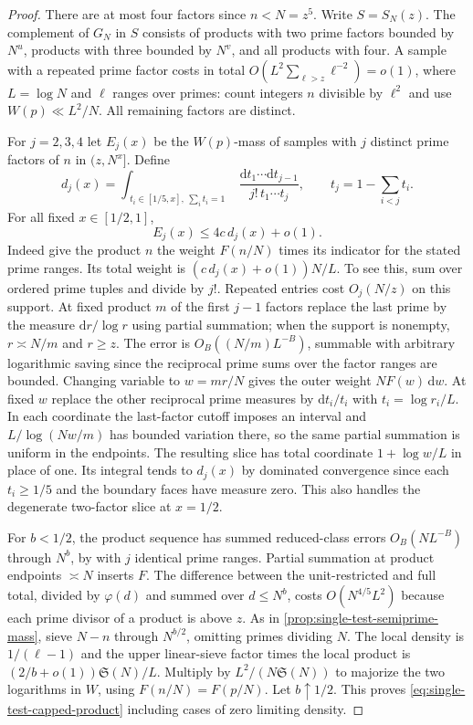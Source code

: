 \documentclass[11pt,a4paper]{article}
\numberwithin{equation}{section}
\newcommand{\SSS}{\mathfrak S}
\newcommand{\ud}{\mathrm d}
\begin{document}
\begin{proof}
There are at most four factors since $n<N=z^5$. Write $S=S_N(z)$.
The complement of $G_N$ in $S$ consists of products with two
prime factors bounded by $N^u$, products with three bounded by
$N^v$, and all products with four. A sample with a repeated
prime factor costs in total $O(L^2\sum_{\ell>z}\ell^{-2})=o(1)$,
where $L=\log N$ and $\ell$ ranges over primes: count integers
$n$ divisible by $\ell^2$ and use $W(p)\ll L^2/N$.
All remaining factors are distinct.

For $j=2,3,4$ let $E_j(x)$ be the $W(p)$-mass of samples with
$j$ distinct prime factors of $n$ in $(z,N^x]$. Define
\[
 d_j(x)=
 \int_{\substack{t_i\in[1/5,x],\ \sum_i t_i=1}}
          \frac{\ud t_1\cdots\ud t_{j-1}}{j!\,t_1\cdots t_j},
 \qquad t_j=1-\sum_{i<j}t_i.
\]
For all fixed $x\in[1/2,1]$,
\begin{equation}
 E_j(x)\le 4c\,d_j(x)+o(1).
 \label{eq:single-test-capped-product}
\end{equation}
Indeed give the product $n$ the weight $F(n/N)$ times its
indicator for the stated prime ranges. Its total weight is
$(c\,d_j(x)+o(1))N/L$. To see this, sum over ordered prime
tuples and divide by $j!$. Repeated entries cost $O_j(N/z)$
on this support. At fixed product $m$ of the first $j-1$
factors replace the last prime by the measure $\ud r/\log r$
using partial summation; when the support is nonempty,
$r\asymp N/m$ and $r\ge z$. The error is
$O_B((N/m)L^{-B})$, summable with arbitrary logarithmic saving
since the reciprocal prime sums over the factor ranges are bounded.
Changing variable to $w=mr/N$ gives the outer weight $NF(w)\,\ud w$.
At fixed $w$ replace the other reciprocal prime measures by
$\ud t_i/t_i$ with $t_i=\log r_i/L$. In each coordinate the
last-factor cutoff imposes an interval and $L/\log(Nw/m)$
has bounded variation there, so the same partial summation
is uniform in the endpoints. The resulting slice has total
coordinate $1+\log w/L$ in place of one. Its integral tends
to $d_j(x)$ by dominated convergence since each $t_i\ge1/5$
and the boundary faces have measure zero. This also handles
the degenerate two-factor slice at $x=1/2$.

For $b<1/2$, the product sequence has summed reduced-class
errors $O_B(NL^{-B})$ through $N^b$, by
\cite[Theorem~3.2]{LiuParkSong} with $j$ identical prime ranges.
Partial summation at product endpoints $\asymp N$ inserts $F$.
The difference between the unit-restricted and full total,
divided by $\varphi(d)$ and summed over $d\le N^b$, costs
$O(N^{4/5}L^2)$ because each prime divisor of a product is
above $z$. As in \cref{prop:single-test-semiprime-mass}, sieve
$N-n$ through $N^{b/2}$, omitting primes dividing $N$. The
local density is $1/(\ell-1)$ and the upper linear-sieve
factor times the local product is $(2/b+o(1))\SSS(N)/L$.
Multiply by $L^2/(N\SSS(N))$ to majorize the two logarithms
in $W$, using $F(n/N)=F(p/N)$. Let $b\uparrow1/2$. This proves
\eqref{eq:single-test-capped-product} including cases of zero
limiting density.


\end{proof}
\end{document}
